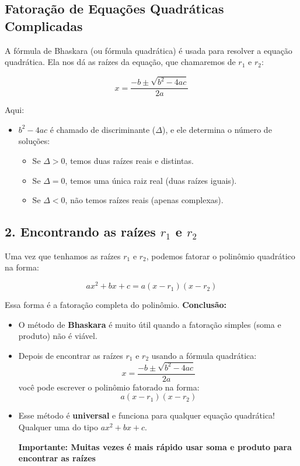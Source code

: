 \documentclass{article}
\begin{document}
\subsection{Fatoração de Equações Quadráticas Complicadas}
A fórmula de Bhaskara (ou fórmula quadrática) é usada para resolver a equação quadrática. Ela nos dá as raízes da equação, que chamaremos de \(r_1\) e \(r_2\):

\[
x = \frac{-b \pm \sqrt{b^2 - 4ac}}{2a}
\]

Aqui:
\begin{itemize}
    \item \(b^2 - 4ac\) é chamado de discriminante (\(\Delta\)), e ele determina o número de soluções:
    \begin{itemize}
        \item Se \(\Delta > 0\), temos duas raízes reais e distintas.
        \item Se \(\Delta = 0\), temos uma única raiz real (duas raízes iguais).
        \item Se \(\Delta < 0\), não temos raízes reais (apenas complexas).
    \end{itemize}
\end{itemize}

\subsection*{2. Encontrando as raízes \(r_1\) e \(r_2\)}

Uma vez que tenhamos as raízes \(r_1\) e \(r_2\), podemos fatorar o polinômio quadrático na forma:

\[
ax^2 + bx + c = a(x - r_1)(x - r_2)
\]

Essa forma é a fatoração completa do polinômio.
\textbf{Conclusão:}

\begin{itemize}
    \item O método de \textbf{Bhaskara} é muito útil quando a fatoração simples (soma e produto) não é viável.

    \item Depois de encontrar as raízes \(r_1\) e \(r_2\) usando a fórmula quadrática:
    \[
    x = \frac{{-b \pm \sqrt{{b^2 - 4ac}}}}{2a}
    \]
    você pode escrever o polinômio fatorado na forma:
    \[
    a(x - r_1)(x - r_2)
    \]

    \item Esse método é \textbf{universal} e funciona para qualquer equação quadrática! Qualquer uma do tipo \(ax^2 + bx + c\).

    \textbf{Importante: Muitas vezes é mais rápido usar soma e produto para encontrar as raízes}
    
\end{itemize}
\end{document}
